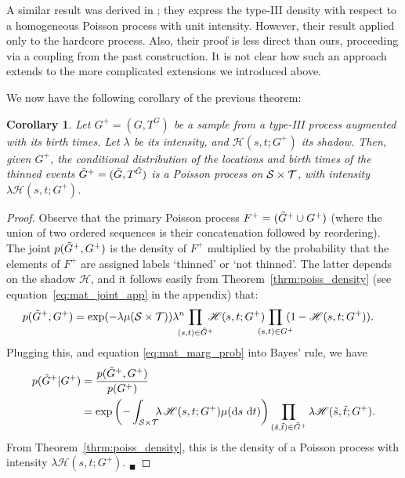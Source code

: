 \documentclass{statsoc}
\newtheorem{coro}[defn]{Corollary}
\begin{document}
A similar result was derived in \cite{Hube:Wolp:2009}; they express the \matern type-III density with respect to a homogeneous Poisson 
process with unit intensity. However, their result applied only to the hardcore process. Also, their proof is less direct than ours, proceeding 
via a coupling from the past construction. It is not clear
how such an approach extends to the more complicated extensions we introduced above.

We now have the following corollary of the previous theorem:
\begin{coro} \label{prop:mat_post} Let ${G^+ = (G, T^G)}$ be a sample from a \matern type-III process 
 augmented with its birth times. Let $\lambda$ be its intensity, and $\mathscr{H}(s,t;G^+)$ its shadow.
Then, given $G^+$, the conditional distribution of the locations and birth times of the thinned events
${\tilde{G}^+ = (\tilde{G},T^{\tilde{G}})}$ is a Poisson process on ${{\mathcal S} \times {\mathcal T}}$, with intensity $\lambda  \mathscr{H}(s,t; G^+)$.
\end{coro}
\begin{proof}
Observe that the primary Poisson process $F^+ = (\tilde{G}^+ \cup G^+)$ (where the union of two ordered sequences is their concatenation followed
by reordering).  The joint $p(\tilde{G}^+, G^+)$ is the density of $F^+$ multiplied by the
probability that the elements of $F^+$ are assigned labels `thinned' or `not thinned'. 
The latter depends on the shadow $\mathscr{H}$, and it follows easily from Theorem~\ref{thrm:poiss_density} 
(see equation~\eqref{eq:mat_joint_app} in the appendix) that:
\begin{align}
   p(\tG^+, G^+) &= \exp(-\lambda \mu(\cS \times \cT)) \lambda^{n}  \! \! \! \!\! \prod_{(s,t) \in \tG^+}  \! \! \! \!\mathscr{H}(s,t;G^+)  \! \! \! \! \! \prod_{(s,t) \in G^+}  \! \! \! \!(1- \mathscr{H}(s,t;G^+)). \label{eq:mat_joint}
\end{align}
Plugging this, and equation \eqref{eq:mat_marg_prob} into Bayes' rule, we have
\begin{align}
  p(\tG^+ | G^+) &= \frac{p(\tG^+, G^+)}{p(G^+)} \\ %
  &= \exp \left(- \int_{\cS \times \cT} \!\!\!\lambda\, \mathscr{H}(s,t; G^+) \mu(\dif s\ \dif t) \right)
              \prod_{(\tilde{s},\tilde{t}) \in \tG^+} \lambda \mathscr{H}(\tilde{s}, \tilde{t}; G^+).  \label{eq:mat_post}
\end{align}
From Theorem~\ref{thrm:poiss_density}, this is the density of a Poisson process with intensity $\lambda \mathscr{H}(s, t; G^+)$. \hfill ${}_\blacksquare$ %
\end{proof}
\end{document}

